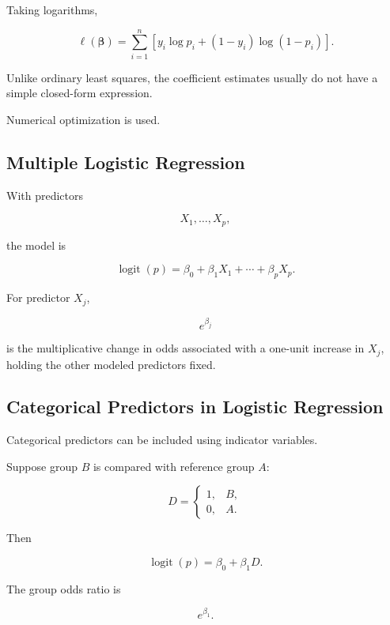 Taking logarithms,

\[
\boxed{
\ell(\boldsymbol{\beta})
=
\sum_{i=1}^{n}
\left[
y_i\log p_i
+
(1-y_i)\log(1-p_i)
\right].
}
\]

Unlike ordinary least squares, the coefficient estimates usually do not
have a simple closed-form expression.

Numerical optimization is used.

\subsection{Multiple Logistic Regression}
\label{subsec:multiple-logistic-regression}

With predictors

\[
X_1,\ldots,X_p,
\]

the model is

\[
\boxed{
\operatorname{logit}(p)
=
\beta_0
+
\beta_1X_1
+
\cdots
+
\beta_pX_p.
}
\]

For predictor \(X_j\),

\[
\boxed{
e^{\beta_j}
}
\]

is the multiplicative change in odds associated with a one-unit increase
in \(X_j\), holding the other modeled predictors fixed.

\subsection{Categorical Predictors in Logistic Regression}
\label{subsec:categorical-predictors-logistic}

Categorical predictors can be included using indicator variables.

Suppose group \(B\) is compared with reference group \(A\):

\[
D
=
\begin{cases}
1,&B,\\
0,&A.
\end{cases}
\]

Then

\[
\boxed{
\operatorname{logit}(p)
=
\beta_0+\beta_1D.
}
\]

The group odds ratio is

\[
\boxed{
e^{\beta_1}.
}
\]

